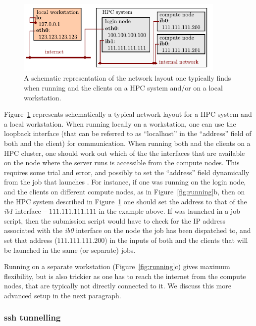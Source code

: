 \documentclass[11pt,english,fleqn]{report}
\begin{document}
\begin{figure}[hbt]
\centering\includegraphics[width=0.9\textwidth]{ipi-network.pdf}
\caption{\label{fig:network} A schematic representation of the network layout one 
typically finds when running \ipi and the clients on a HPC system and/or on a local workstation. } 
\end{figure}

Figure~\ref{fig:network} represents schematically a typical network layout
for a HPC system and a local workstation. When running \ipi locally on a 
workstation, one can use the loopback interface (that can be referred to as 
``localhost'' in the ``address'' field of both \ipi and the client) for communication.
When running both \ipi and the clients on a HPC cluster, one should work out which of the
the interfaces that are available on the node where the \ipi server runs is accessible from the
compute nodes. This requires some trial and error, and possibly to set the 
 ``address'' field dynamically from the job that launches \ipi. 
 For instance,
if one was running \ipi on the login node, and the clients on different compute nodes, as 
in Figure~\ref{fig:running}b, then on the HPC system described in Figure~\ref{fig:network} 
one should set the address to that of the \emph{ib1} interface -- $111.111.111.111$ in 
the example above. If \ipi was launched in a job script, then the submission script would
have to check for the IP address associated with the \emph{ib0} interface on the node
the job has been dispatched to, and set that address ($111.111.111.200$) in the inputs
of both \ipi and the clients that will be launched in the same (or separate) jobs.

Running \ipi on a separate workstation (Figure~\ref{fig:running}c) gives 
maximum flexibility, but is also trickier as one has to reach the 
internet from the compute nodes, that are typically not directly connected to it. 
We discuss this more advanced setup in the next paragraph.

\subsubsection{ssh tunnelling}
\end{document}
